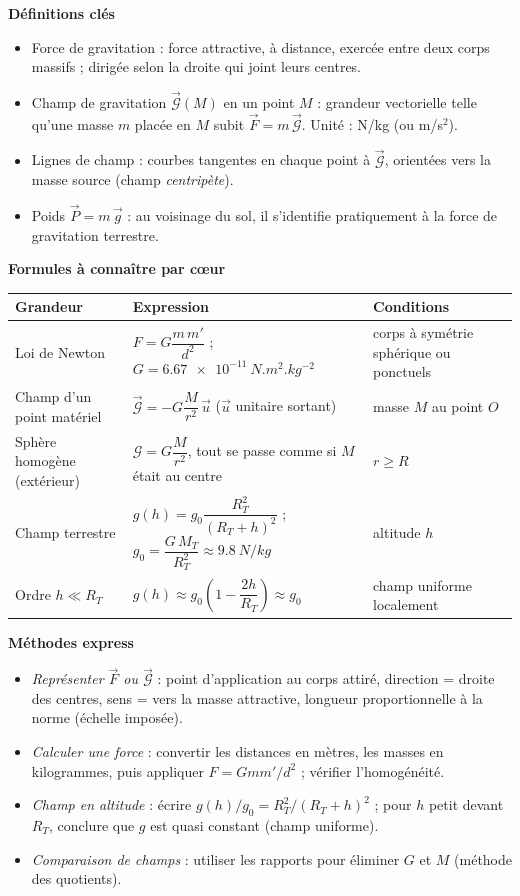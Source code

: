 \documentclass[11pt]{article}
\newcommand{\cle}[1]{{\popxbold\color{popdark}#1}}
\begin{document}
\begin{bilan}
\textbf{Définitions clés}
\begin{itemize}
  \item \cle{Force de gravitation} : force attractive, à distance, exercée entre deux corps massifs ; dirigée selon la droite qui joint leurs centres.
  \item \cle{Champ de gravitation} $\vec{\mathcal{G}}(M)$ en un point $M$ : grandeur vectorielle telle qu'une masse $m$ placée en $M$ subit $\vec{F}=m\,\vec{\mathcal{G}}$. Unité : N/kg (ou m/s$^{2}$).
  \item \cle{Lignes de champ} : courbes tangentes en chaque point à $\vec{\mathcal{G}}$, orientées vers la masse source (champ \emph{centripète}).
  \item \cle{Poids} $\vec{P}=m\,\vec{g}$ : au voisinage du sol, il s'identifie pratiquement à la force de gravitation terrestre.
\end{itemize}

\textbf{Formules à connaître par c\oe ur}
\begin{center}
\begin{tabularx}{\linewidth}{|l|X|l|}\hline
\rowcolor{popblueL} \textbf{Grandeur} & \textbf{Expression} & \textbf{Conditions} \\ \hline
Loi de Newton & $F=G\dfrac{m\,m'}{d^{2}}$ ; $G=\SI{6,67e-11}{N.m^{2}.kg^{-2}}$ & corps à symétrie sphérique ou ponctuels \\ \hline
Champ d'un point matériel & $\vec{\mathcal{G}}=-G\dfrac{M}{r^{2}}\,\vec{u}$ ($\vec{u}$ unitaire sortant) & masse $M$ au point $O$ \\ \hline
Sphère homogène (extérieur) & $\mathcal{G}=G\dfrac{M}{r^{2}}$, tout se passe comme si $M$ était au centre & $r\geq R$ \\ \hline
Champ terrestre & $g(h)=g_{0}\dfrac{R_{T}^{2}}{(R_{T}+h)^{2}}$ ; $g_{0}=\dfrac{G\,M_{T}}{R_{T}^{2}}\approx\SI{9,8}{N/kg}$ & altitude $h$ \\ \hline
Ordre $h\ll R_{T}$ & $g(h)\approx g_{0}\left(1-\dfrac{2h}{R_{T}}\right)\approx g_{0}$ & champ uniforme localement \\ \hline
\end{tabularx}
\end{center}

\textbf{Méthodes express}
\begin{itemize}
  \item \emph{Représenter $\vec{F}$ ou $\vec{\mathcal{G}}$} : point d'application au corps attiré, direction = droite des centres, sens = vers la masse attractive, longueur proportionnelle à la norme (échelle imposée).
  \item \emph{Calculer une force} : convertir les distances en mètres, les masses en kilogrammes, puis appliquer $F=Gmm'/d^{2}$ ; vérifier l'homogénéité.
  \item \emph{Champ en altitude} : écrire $g(h)/g_{0}=R_{T}^{2}/(R_{T}+h)^{2}$ ; pour $h$ petit devant $R_{T}$, conclure que $g$ est quasi constant (champ uniforme).
  \item \emph{Comparaison de champs} : utiliser les rapports pour éliminer $G$ et $M$ (méthode des quotients).
\end{itemize}
\end{bilan}
\end{document}
